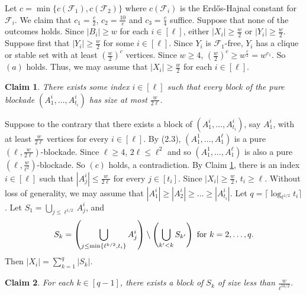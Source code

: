 \documentclass[a4paper,11pt]{article}
\newtheorem{claim}{Claim}[theorem]
\let\oldendproof\endproof
\renewenvironment{proof}[1][\proofname]{%
	\oldproof[\normalfont\bfseries #1]%
}{\oldendproof}
\renewcommand{\qedsymbol}{$\square$}%
\newenvironment{subproof}[1][\normalfont\it Subproof]{%
	\renewcommand{\qedsymbol}{{\tiny{$\blacksquare$}}}%
	\begin{proof}[#1]%
	}{%
	\end{proof}%
}
\begin{document}
\begin{proof}
        Let $c=\min\{c(\mathcal{F}_1),c(\mathcal{F}_2)\}$ where $c(\mathcal{F}_i)$ is the Erd\H{o}s-Hajnal constant for $\mathcal{F}_i$.
        We claim that $c_1=\frac{c}{2}$, $c_2=\frac{10}{c}$ and $c_3=\frac{c}{4}$ suffice. 
        Suppose that none of the outcomes holds.
        Since $|B_i|\geq w$ for each $i\in [\ell]$, either $|X_i|\geq \frac{w}{2}$ or $|Y_i|\geq \frac{w}{2}$. 
        Suppose first that $|Y_i|\geq \frac{w}{2}$ for some $i\in [\ell]$. 
        Since $Y_i$ is $\mathcal{F}_1$-free, $Y_i$ has a clique or stable set with at least $(\frac{w}{2})^c$ vertices.
        Since $w\geq 4$, $(\frac{w}{2})^c\geq w^{\frac{c}{2}}=w^{c_1}$. 
        So $(a)$ holds. 
        Thus, we may assume that $|X_i|\geq \frac{w}{2}$ for each $i\in [\ell]$.  
        \begin{claim}\label{clm:upbound of block A}
            There exists some index $i\in [\ell]$ such that every block of the pure blockade $(A^i_1,\ldots, A^i_{t_i})$ has size at most $\frac{w}{2\ell}$. 
        \end{claim}
        \begin{subproof}[Proof of Claim \ref{clm:upbound of block A}]
            Suppose to the contrary that there exists a block of $(A^i_1,\ldots, A^i_{t_i})$, say $A_1^i$, with at least $\frac{w}{2\ell}$ vertices for every $i\in [\ell]$. 
            By (2.3), $(A_1^1,\ldots, A_1^\ell)$ is a pure $(\ell, \frac{w}{2\ell})$-blockade. 
            Since $\ell\geq 4$, $2\ell\leq \ell^2$ and so
            $(A_1^1,\ldots, A_1^\ell)$ is also a pure $(\ell, \frac{w}{\ell^2})$-blockade. 
            So $(c)$ holds, a contradiction. 
        \end{subproof}
        By Claim \ref{clm:upbound of block A}, there is an index $i\in [\ell]$ such that $|A_j^i|\leq \frac{w}{2\ell}$ for every $j\in [t_i]$. 
        Since $|X_i|\geq \frac{w}{2}$, $t_i\geq \ell$. 
        Without loss of generality, we may assume that $|A_1^i|\geq |A_2^i|\geq \ldots\geq |A_{t_i}^i|$. 
        Let $q=\lceil \log_{\ell^{1/2}}t_i\rceil$. 
        Let $S_1=\bigcup_{j\leq \ell^{1/2}}A_j^i$, and $$S_k=\left(\bigcup_{j\leq \min\{\ell^{k/2},t_i\}}A^i_j\right)\setminus \left(\bigcup_{k'<k}S_{k'}\right) \textnormal{ for } k=2,\ldots,q.$$ 
        Then $|X_i|=\sum_{k=1}^q |S_k|$.
        \begin{claim}\label{clm:upbound of block in S}
            For each $k\in [q-1]$, there exists a block of $S_k$ of size less than $\frac{w}{\ell^{5k/2}}$. 
        \end{claim}
        \begin{subproof}[Proof of Claim \ref{clm:upbound of block in S}]

\end{subproof}
\end{proof}
\end{document}
